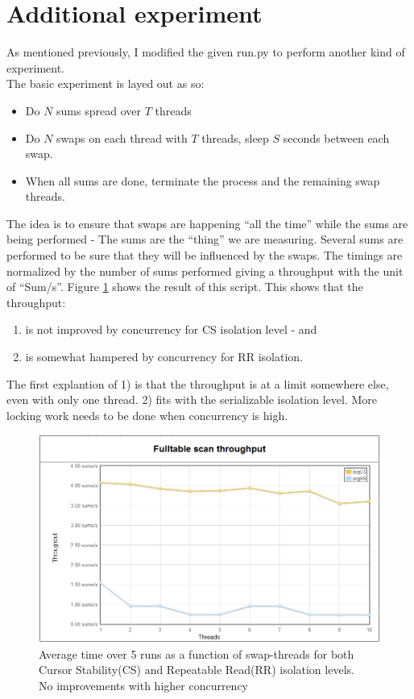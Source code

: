 \section{Additional experiment}\label{sec:add}
As mentioned previously, I modified the given run.py to perform another kind of
experiment. \\

The basic experiment is layed out as so:
\begin{itemize}
   \item Do $N$ sums spread over $T$ threads
   \item Do $N$ swaps on each thread with $T$ threads, sleep $S$ seconds between each swap.
   \item When all sums are done, terminate the process and the remaining swap
     threads.
\end{itemize}
The idea is to ensure that swaps are happening ``all the time'' while the sums
are being performed - The sums are the ``thing'' we are measuring. Several sums
are performed to be sure that they will be influenced by the swaps. The timings
are normalized by the number of sums performed giving a throughput with the unit
of ``Sum/s''. Figure \ref{fig:curontp} shows the result of this script. This
shows that the throughput:
\begin{enumerate}
  \item is not improved by concurrency for CS isolation level - and 
  \item is somewhat hampered by concurrency for RR isolation.
\end{enumerate}
The first explantion of 1) is that the throughput is at a limit somewhere else,
even with only one thread. 2) fits with the serializable isolation level. More
locking work needs to be done when concurrency is high.

\begin{figure}
  \centering
  \includegraphics[width=12cm]{assignment1/curon_tp}
  \caption[Average time over 5 runs - new script]{Average time over 5 runs as a function of
  swap-threads for both Cursor Stability(CS) and Repeatable Read(RR) isolation levels.\\
  No improvements with higher concurrency}\label{fig:curontp}
\end{figure}

